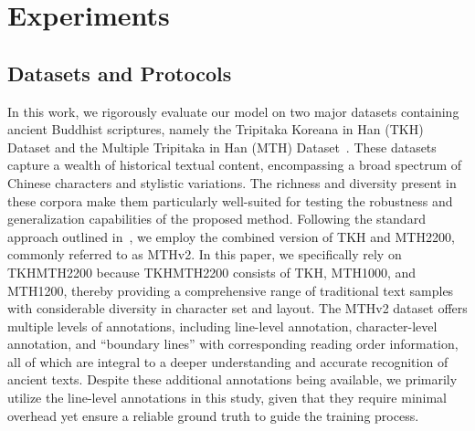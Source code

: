 
\section{Experiments}

\subsection{Datasets and Protocols}
%
%

In this work, we rigorously evaluate our model on two major datasets containing ancient Buddhist scriptures, namely the Tripitaka Koreana in Han (TKH) Dataset and the Multiple Tripitaka in Han (MTH) Dataset~\cite{tkhmth}. These datasets capture a wealth of historical textual content, encompassing a broad spectrum of Chinese characters and stylistic variations. The richness and diversity present in these corpora make them particularly well-suited for testing the robustness and generalization capabilities of the proposed method. Following the standard approach outlined in~\cite{jla}, we employ the combined version of TKH and MTH2200, commonly referred to as MTHv2. In this paper, we specifically rely on TKHMTH2200 because TKHMTH2200 consists of TKH, MTH1000, and MTH1200, thereby providing a comprehensive range of traditional text samples with considerable diversity in character set and layout. The MTHv2 dataset offers multiple levels of annotations, including line-level annotation, character-level annotation, and “boundary lines” with corresponding reading order information, all of which are integral to a deeper understanding and accurate recognition of ancient texts. Despite these additional annotations being available, we primarily utilize the line-level annotations in this study, given that they require minimal overhead yet ensure a reliable ground truth to guide the training process.

